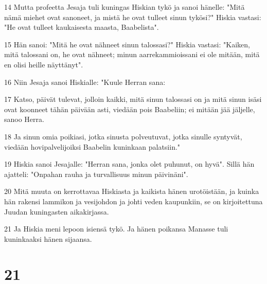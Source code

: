 \par 14 Mutta profeetta Jesaja tuli kuningas Hiskian tykö ja sanoi hänelle: "Mitä nämä miehet ovat sanoneet, ja mistä he ovat tulleet sinun tykösi?" Hiskia vastasi: "He ovat tulleet kaukaisesta maasta, Baabelista".
\par 15 Hän sanoi: "Mitä he ovat nähneet sinun talossasi?" Hiskia vastasi: "Kaiken, mitä talossani on, he ovat nähneet; minun aarrekammioissani ei ole mitään, mitä en olisi heille näyttänyt".
\par 16 Niin Jesaja sanoi Hiskialle: "Kuule Herran sana:
\par 17 Katso, päivät tulevat, jolloin kaikki, mitä sinun talossasi on ja mitä sinun isäsi ovat koonneet tähän päivään asti, viedään pois Baabeliin; ei mitään jää jäljelle, sanoo Herra.
\par 18 Ja sinun omia poikiasi, jotka sinusta polveutuvat, jotka sinulle syntyvät, viedään hovipalvelijoiksi Baabelin kuninkaan palatsiin."
\par 19 Hiskia sanoi Jesajalle: "Herran sana, jonka olet puhunut, on hyvä". Sillä hän ajatteli: "Onpahan rauha ja turvallisuus minun päivinäni".
\par 20 Mitä muuta on kerrottavaa Hiskiasta ja kaikista hänen urotöistään, ja kuinka hän rakensi lammikon ja vesijohdon ja johti veden kaupunkiin, se on kirjoitettuna Juudan kuningasten aikakirjassa.
\par 21 Ja Hiskia meni lepoon isiensä tykö. Ja hänen poikansa Manasse tuli kuninkaaksi hänen sijaansa.

\chapter{21}

